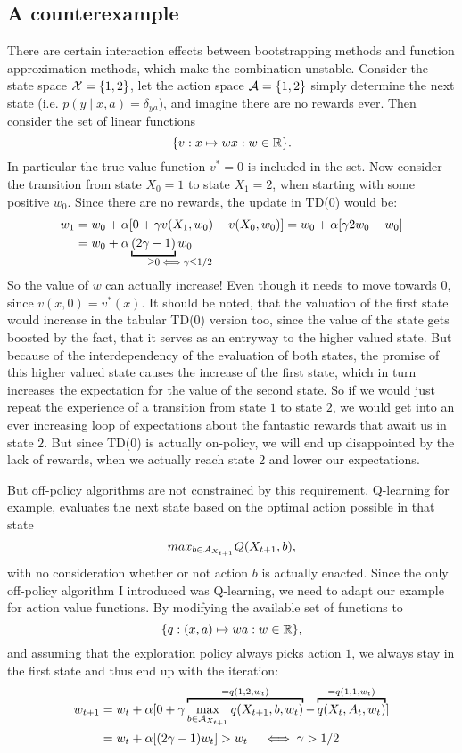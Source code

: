 \subsection{A counterexample}

There are certain interaction effects between bootstrapping methods and function approximation methods, which make the combination unstable. Consider the state space \(\mathcal{X}=\{1,2\}\), let the action space \(\mathcal{A}=\{1,2\}\) simply determine the next state (i.e. \(p(y\mid x,a)=\delta_{ya} \)), and imagine there are no rewards ever. Then consider the set of linear functions
\[
	\{v:x\mapsto w x :w\in\mathbb{R}\}.
\] 
In particular the true value function \(v^*=0\) is included in the set. Now consider the transition from state \(X_0=1\) to state \(X_1=2\), when starting with some positive \(w_0\). Since there are no rewards, the update in TD(0) would be:
\begin{align*}
	w_1 
	&= w_0 + \alpha [0+\gamma v(X_1,w_0) - v(X_0,w_0)]
	=w_0 + \alpha[\gamma 2w_0 - w_0]\\
	&=w_0 + \alpha \underbracket[1pt]{(2\gamma -1)}_{\ge 0 \mathrlap{\iff \gamma \le 1/2}} w_0
\end{align*}
So the value of \(w\) can actually increase! Even though it needs to move towards 0, since \(v(x,0)=v^*(x)\). It should be noted, that the valuation of the first state would increase in the tabular TD(0) version too, since the value of the state gets boosted by the fact, that it serves as an entryway to the higher valued state. But because of the interdependency of the evaluation of both states, the promise of this higher valued state causes the increase of the first state, which in turn increases the expectation for the value of the second state. So if we would just repeat the experience of a transition from state \(1\) to state \(2\), we would get into an ever increasing loop of expectations about the fantastic rewards that await us in state \(2\). But since TD(0) is actually on-policy, we will end up disappointed by the lack of rewards, when we actually reach state 2 and lower our expectations. 

But off-policy algorithms are not constrained by this requirement. Q-learning for example, evaluates the next state based on the optimal action possible in that state
\[
	max_{b\in\mathcal{A}_{X_{t+1}}}Q(X_{t+1}, b),
\]
with no consideration whether or not action \(b\) is actually enacted. Since the only off-policy algorithm I introduced was Q-learning, we need to adapt our example for action value functions. By modifying the available set of functions to
\[
	\{q: (x,a)\mapsto w a:w\in\mathbb{R} \},
\]
and assuming that the exploration policy always picks action \(1\), we always stay in the first state and thus end up with the iteration:
\begin{align*}
	w_{t+1} &=w_t+\alpha[0+\gamma 
	\overbracket[1pt]{\max_{b\in\cA_{X_{t+1}}}q(X_{t+1}, b,w_t)}^{
		=q(1,2,w_t)
	} - \overbracket[1pt]{q(X_t,A_t,w_t)}^{=q(1,1,w_t)}]\\
	&=w_t + \alpha[ (2\gamma-1)w_t]> w_t \quad \iff \gamma>1/2 
\end{align*}

